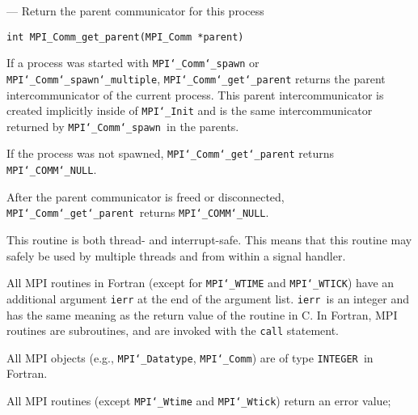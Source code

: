 \startmanpage
{}
--- Return the parent communicator for this process 
\startvb\begin{verbatim}
int MPI_Comm_get_parent(MPI_Comm *parent)

\end{verbatim}
\endvb

\par
{}
\par
If a process was started with {\tt MPI{\tt \char`\_}Comm{\tt \char`\_}spawn} or {\tt MPI{\tt \char`\_}Comm{\tt \char`\_}spawn{\tt \char`\_}multiple},
{\tt MPI{\tt \char`\_}Comm{\tt \char`\_}get{\tt \char`\_}parent} returns the parent intercommunicator of the current
process. This parent intercommunicator is created implicitly inside of
{\tt MPI{\tt \char`\_}Init} and is the same intercommunicator returned by {\tt MPI{\tt \char`\_}Comm{\tt \char`\_}spawn
}in the parents.
\par
If the process was not spawned, {\tt MPI{\tt \char`\_}Comm{\tt \char`\_}get{\tt \char`\_}parent} returns
{\tt MPI{\tt \char`\_}COMM{\tt \char`\_}NULL}.
\par
After the parent communicator is freed or disconnected, {\tt MPI{\tt \char`\_}Comm{\tt \char`\_}get{\tt \char`\_}parent
}returns {\tt MPI{\tt \char`\_}COMM{\tt \char`\_}NULL}.
\par
{}
\par
This routine is both thread- and interrupt-safe.
This means that this routine may safely be used by multiple threads and
from within a signal handler.
\par
{}
All MPI routines in Fortran (except for {\tt MPI{\tt \char`\_}WTIME} and {\tt MPI{\tt \char`\_}WTICK}) have
an additional argument {\tt ierr} at the end of the argument list.  {\tt ierr
}is an integer and has the same meaning as the return value of the routine
in C.  In Fortran, MPI routines are subroutines, and are invoked with the
{\tt call} statement.
\par
All MPI objects (e.g., {\tt MPI{\tt \char`\_}Datatype}, {\tt MPI{\tt \char`\_}Comm}) are of type {\tt INTEGER
}in Fortran.
\par
{}
\par
All MPI routines (except {\tt MPI{\tt \char`\_}Wtime} and {\tt MPI{\tt \char`\_}Wtick}) return an error value;
